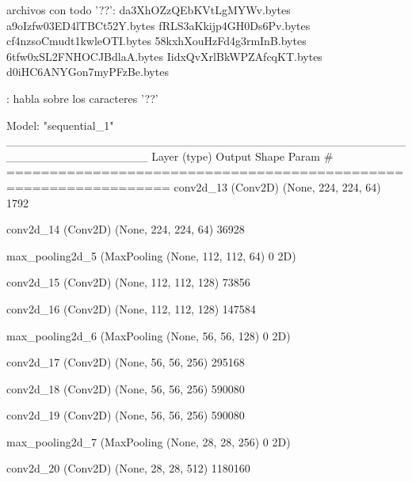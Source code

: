 \documentclass[11pt, a4paper]{article} %
\begin{document}
archivos con todo '??':
da3XhOZzQEbKVtLgMYWv.bytes
a9oIzfw03ED4lTBCt52Y.bytes
 fRLS3aKkijp4GH0Ds6Pv.bytes
 cf4nzsoCmudt1kwleOTI.bytes
 58kxhXouHzFd4g3rmInB.bytes
 6tfw0xSL2FNHOCJBdlaA.bytes
 IidxQvXrlBkWPZAfcqKT.bytes
d0iHC6ANYGon7myPFzBe.bytes

\citep{narayanan2016performance} : habla sobre los caracteres '??'


Model: "sequential_1"
_________________________________________________________________
 Layer (type)                Output Shape              Param #   
=================================================================
 conv2d_13 (Conv2D)          (None, 224, 224, 64)      1792      
                                                                 
 conv2d_14 (Conv2D)          (None, 224, 224, 64)      36928     
                                                                 
 max_pooling2d_5 (MaxPooling  (None, 112, 112, 64)     0         
 2D)                                                             
                                                                 
 conv2d_15 (Conv2D)          (None, 112, 112, 128)     73856     
                                                                 
 conv2d_16 (Conv2D)          (None, 112, 112, 128)     147584    
                                                                 
 max_pooling2d_6 (MaxPooling  (None, 56, 56, 128)      0         
 2D)                                                             
                                                                 
 conv2d_17 (Conv2D)          (None, 56, 56, 256)       295168    
                                                                 
 conv2d_18 (Conv2D)          (None, 56, 56, 256)       590080    
                                                                 
 conv2d_19 (Conv2D)          (None, 56, 56, 256)       590080    
                                                                 
 max_pooling2d_7 (MaxPooling  (None, 28, 28, 256)      0         
 2D)                                                             
                                                                 
 conv2d_20 (Conv2D)          (None, 28, 28, 512)       1180160   
                                                                 
\end{document}
